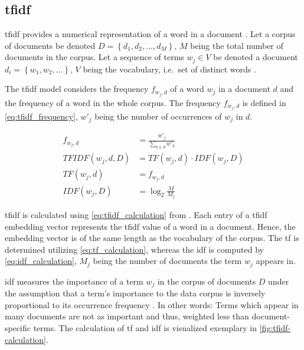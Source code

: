 \subsection{\acl*{tfidf}}\label{subsec:tfidf}

\ac{tfidf} provides a numerical representation of a word in a document \cite{clusteringDocs2020}.
Let a corpus of documents be denoted $D= \left\{d_1, d_2, ..., d_M  \right\}$, $M$ being the total number of documents in the corpus. 
Let a sequence of terms $w_{j} \in V$ be denoted a document $d_i = \left\{w_{1}, w_{2}, ...\right\}$, 
$V$ being the vocabulary, 
i.e.\ set of distinct words \cite{clusteringDocs2020}.

The \ac{tfidf} model considers the frequency $f_{w_{j}, d}$  of a word $w_{j}$ in a document $d$ and the frequency of a word in the whole corpus. 
The frequency $f_{w_{j}, d}$ is defined in \autoref{eq:tfidf_frequency}, $w'_j$ being the number of occurrences of $w_j$ in $d$.

\begin{align}
    f_{w_{j}, d} &= \frac{w'_{j}}{\sum_{k \in d} w'_k}\label{eq:tfidf_frequency}\\
    TFIDF(w_{j}, d, D) &= TF(w_{j}, d) \cdot IDF(w_{j}, D)\label{eq:tfidf_calculation}\\
    TF(w_{j}, d) &= f_{w_{j}, d}\label{eq:tf_calculation}\\
    IDF(w_{j}, D) &= \log_2\frac{M}{M_{j}}\label{eq:idf_calculation}
\end{align}

\ac{tfidf} is calculated using \autoref{eq:tfidf_calculation} from \cite{clusteringDocs2020}.
Each entry of a \ac{tfidf} embedding vector represents the \ac{tfidf} value of a word in a document.
Hence, the embedding vector is of the same length as the vocabulary of the corpus.
The \ac{tf} is determined utilizing \autoref{eq:tf_calculation}, 
whereas the \ac{idf} is computed by \autoref{eq:idf_calculation}, 
$M_{j}$ being the number of documents the term $w_{j}$ appears in.

\ac{idf} measures the importance of a term $w_{j}$ in the corpus of documents $D$
under the assumption that a term's importance to the data corpus is inversely proportional to its occurrence frequency \cite{tfidf2008}.
In other words: Terms which appear in many documents are not as important and thus, weighted less than document-specific terms. 
The calculation of \ac{tf} and \ac{idf} is visualized exemplary in \autoref{fig:tfidf-calculation}.


